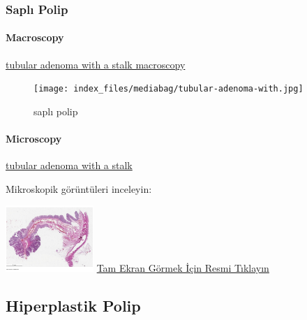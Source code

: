 \documentclass[
  letterpaper,
  DIV=11,
  numbers=noendperiod]{scrreprt}
\let\oldparagraph\paragraph
\renewcommand{\paragraph}[1]{\oldparagraph{#1}\mbox{}}
\begin{document}
\hypertarget{sec-kolon-sapli-polip}{%
\subsubsection{Saplı Polip}\label{sec-kolon-sapli-polip}}

\hypertarget{macroscopy-1}{%
\paragraph{Macroscopy}\label{macroscopy-1}}

\href{https://images.patolojiatlasi.com/tubularadenoma/tubular-adenoma-with-stalk-macroscopy.jpg}{tubular
adenoma with a stalk macroscopy}

\begin{figure}

{\centering \texttt{[image: index\_files/mediabag/tubular-adenoma-with.jpg]}

}

\caption{saplı polip}

\end{figure}

\hypertarget{microscopy}{%
\paragraph{Microscopy}\label{microscopy}}

\href{https://images.patolojiatlasi.com/tubularadenoma/tubular-adenoma-with-stalk.jpeg}{tubular
adenoma with a stalk}

Mikroskopik görüntüleri inceleyin:

\href{https://images.patolojiatlasi.com/tubularadenoma/tubular-adenoma-with-stalk/viewer_z0.html}{\includegraphics[width=0.25\textwidth,height=\textheight]{./screenshots/tubular-adenoma-with-stalk_screenshot.png}}
\href{https://images.patolojiatlasi.com/tubularadenoma/tubular-adenoma-with-stalk/viewer_z0.html}{Tam
Ekran Görmek İçin Resmi Tıklayın}

\hypertarget{sec-kolon-hiperplastik-polip}{%
\subsection{Hiperplastik Polip}\label{sec-kolon-hiperplastik-polip}}
\end{document}
